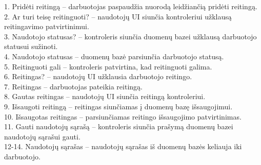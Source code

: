 \documentclass{VUMIFPSkursinis}
\begin{document}
	1. Pridėti reitingą – darbuotojas paspaudžia nuorodą leidžiančią pridėti reitingą.\\
	2. Ar turi teisę reitinguoti? – naudotojų UI siunčia kontroleriui užklausą reitingavimo patvirtinimui.\\
	3. Naudotojo statusas? – kontroleris siunčia duomenų bazei užklausą darbuotojo statusui sužinoti.\\
	4. Naudotojo statusas – duomenų bazė parsiunčia darbuotojo statusą.\\
	5. Reitinguoti gali – kontroleris patvirtina, kad reitinguoti galima.\\
	6. Reitingas? – naudotojų UI užklausia darbuotojo reitingo.\\
	7. Reitingas – darbuotojas pateikia reitingą.\\
	8. Gautas reitingas – naudotojų UI siunčia reitingą kontroleriui.\\
	9. Išsaugoti reitingą – reitingas siunčiamas į duomenų bazę išsaugojimui.\\
	10. Išsaugotas reitingas – parsiunčiamas reitingo išsaugojimo patvirtinimas.\\
	11. Gauti naudotojų sąrašą – kontroleris siunčia prašymą duomenų bazei naudotojų sąrašui gauti.\\
	12-14. Naudotojų sąrašas – naudotojų sąrašas iš duomenų bazės keliauja iki darbuotojo.\\
\end{document}
